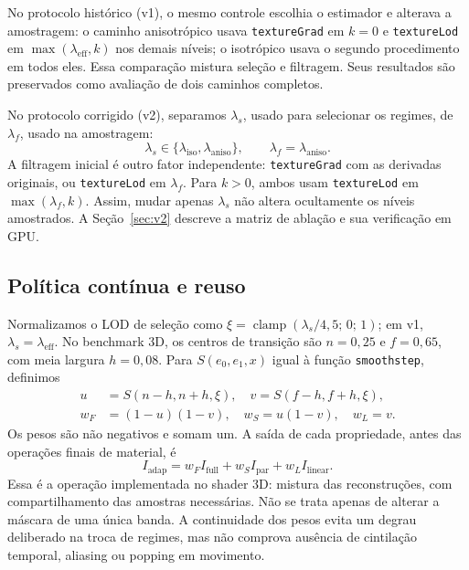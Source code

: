 No protocolo histórico (v1), o mesmo controle escolhia o estimador e alterava a amostragem: o caminho anisotrópico usava \texttt{textureGrad} em $k=0$ e \texttt{textureLod} em $\max(\lambda_{\mathrm{eff}},k)$ nos demais níveis; o isotrópico usava o segundo procedimento em todos eles. Essa comparação mistura seleção e filtragem. Seus resultados são preservados como avaliação de dois caminhos completos.

No protocolo corrigido (v2), separamos $\lambda_s$, usado para selecionar os regimes, de $\lambda_f$, usado na amostragem:
\begin{equation}
\lambda_s\in\{\lambda_{\mathrm{iso}},\lambda_{\mathrm{aniso}}\},\qquad
\lambda_f=\lambda_{\mathrm{aniso}}.
\label{eq:lodseparado}
\end{equation}
A filtragem inicial é outro fator independente: \texttt{textureGrad} com as derivadas originais, ou \texttt{textureLod} em $\lambda_f$. Para $k>0$, ambos usam \texttt{textureLod} em $\max(\lambda_f,k)$. Assim, mudar apenas $\lambda_s$ não altera ocultamente os níveis amostrados. A Seção~\ref{sec:v2} descreve a matriz de ablação e sua verificação em GPU.

\subsection{Política contínua e reuso}
Normalizamos o LOD de seleção como $\xi=\operatorname{clamp}(\lambda_s/4{,}5;\,0;\,1)$; em v1, $\lambda_s=\lambda_{\mathrm{eff}}$. No benchmark 3D, os centros de transição são $n=0{,}25$ e $f=0{,}65$, com meia largura $h=0{,}08$. Para $S(e_0,e_1,x)$ igual à função \texttt{smoothstep}, definimos
\begin{align}
u&=S(n-h,n+h,\xi),\quad v=S(f-h,f+h,\xi),\\
w_F&=(1-u)(1-v),\quad w_S=u(1-v),\quad w_L=v.
\end{align}
Os pesos são não negativos e somam um. A saída de cada propriedade, antes das operações finais de material, é
\begin{equation}
I_{\mathrm{adap}}=w_F I_{\mathrm{full}}+w_S I_{\mathrm{par}}+w_L I_{\mathrm{linear}}.
\label{eq:adaptive}
\end{equation}
Essa é a operação implementada no shader 3D: mistura das reconstruções, com compartilhamento das amostras necessárias. Não se trata apenas de alterar a máscara de uma única banda. A continuidade dos pesos evita um degrau deliberado na troca de regimes, mas não comprova ausência de cintilação temporal, aliasing ou popping em movimento.

